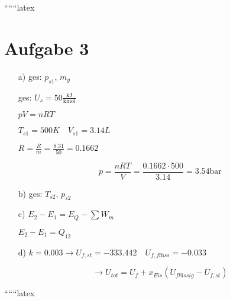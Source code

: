 
``````latex


\section*{Aufgabe 3}

\begin{itemize}
    \item[a)] ges: $p_{s1}$, $m_{g}$
    
    ges: $U_{s} = 50 \frac{\text{kJ}}{\text{kmol}}$
    
    $pV = nRT$
    
    $T_{s1} = 500K \quad V_{s1} = 3.14L$
    
    $R = \frac{R}{m} = \frac{8.31}{50} = 0.1662$
    
    \[
    p = \frac{nRT}{V} = \frac{0.1662 \cdot 500}{3.14} = 3.54 \text{bar}
    \]
    
    \item[b)] ges: $T_{s2}$, $p_{s2}$
    
    \item[c)] $E_{2} - E_{1} = E_{Q} - \sum W_{m}$
    
    $E_{2} - E_{1} = Q_{12}$
    
    \item[d)] $k = 0.003 \rightarrow U_{f,st} = -333.442 \quad U_{f,flüss} = -0.033$
    
    \[
    \rightarrow U_{tot} = U_{f} + x_{Eis} (U_{flüssig} - U_{f,st})
    \]
    
\end{itemize}

``````latex


